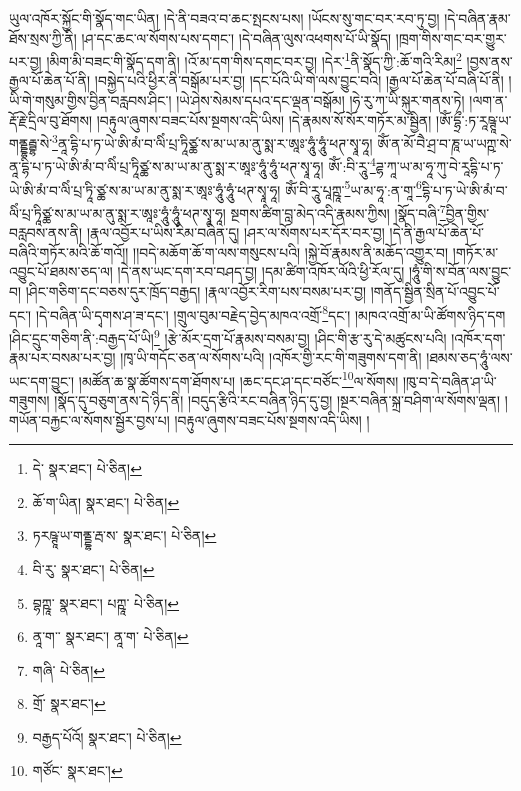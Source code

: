 ཡུལ་འཁོར་སྐྱོང་གི་སྣོད་གང་ཡིན། །དེ་ནི་བཟའ་བ་ཆང་སྤངས་པས། །ཡོངས་སུ་གང་བར་རབ་ཏུ་བྱ། །དེ་བཞིན་རྣམ་ཐོས་སྲས་ཀྱི་ནི། །ཤ་དང་ཆང་ལ་སོགས་པས་དགང་། །དེ་བཞིན་ལུས་འཕགས་པོ་ཡི་སྣོད། །ཁྲག་གིས་གང་བར་གྱུར་པར་བྱ། །མིག་མི་བཟང་གི་སྣོད་དག་ནི། །འོ་མ་དག་གིས་དགང་བར་བྱ། །དེར་\footnote{དེ་  སྣར་ཐང་།  པེ་ཅིན། }ནི་སྣོད་ཀྱི་:ཆོ་གའི་རིམ།\footnote{ཆོ་ག་ཡིན།  སྣར་ཐང་།  པེ་ཅིན། } །བྱས་ནས་རྒྱལ་པོ་ཆེན་པོ་ནི། །བསྐྱེད་པའི་ཕྱིར་ནི་བསྒོམ་པར་བྱ། །དང་པོའི་ཡི་གེ་ལས་བྱུང་བའི། །རྒྱལ་པོ་ཆེན་པོ་བཞི་པོ་ནི། །ཡི་གེ་གསུམ་གྱིས་བྱིན་བརླབས་ཤིང་། །ཡེ་ཤེས་སེམས་དཔའ་དང་ལྡན་བསྒོམ། །ཧེ་རུ་ཀ་ཡི་སྐུར་གནས་ཏེ། །ལག་ན་རྡོ་རྗེ་དྲིལ་བུ་ཐོགས། །བརྟུལ་ཞུགས་བཟང་པོས་སྔགས་འདི་ཡིས། །དེ་རྣམས་སོ་སོར་གཏོར་མ་སྦྱིན། །ཨོཾ་དྷྲྀ་:ཏ་རཱཥྚཱ་ཡ་གནྡྷརྦྷ་སེ་\footnote{ཏརཥྚཱ་ཡ་གནྡྷ་རྦ་ས་  སྣར་ཐང་།  པེ་ཅིན། }ནཱ་དྷི་པ་ཏ་ཡེ་ཨི་མཾ་བ་ལིཾ་པྲ་ཏཱིཙྪ་ས་མ་ཡ་མ་ནུ་སྨ་ར་ཨཱཿ་ཧཱུཾ་ཧཱུཾ་ཕཊ་སྭཱ་ཧཱ། ཨོཾ་ན་མོ་བཻ་ཤྲ་བ་ཎཱ་ཡ་ཡཀྵ་སེ་ནཱ་དྷི་པ་ཏ་ཡེ་ཨི་མཾ་བ་ལིཾ་པྲ་ཏཱིཙྪ་ས་མ་ཡ་མ་ནུ་སྨ་ར་ཨཱཿ་ཧཱུཾ་ཧཱུཾ་ཕཊ་སྭཱ་ཧཱ། ཨོཾ་:བི་རཱུ་\footnote{བི་རུ་  སྣར་ཐང་།  པེ་ཅིན། }ཌྷ་ཀཱ་ཡ་མ་ཧཱ་ཀུ་བེ་རཱདྷི་པ་ཏ་ཡེ་ཨི་མཾ་བ་ལིཾ་པྲ་ཏཱི་ཙྪ་ས་མ་ཡ་མ་ནུ་སྨ་ར་ཨཱཿ་ཧཱུཾ་ཧཱུཾ་ཕཊ་སྭཱ་ཧཱ། ཨོཾ་བི་རཱུ་པཱཀྵཱ་\footnote{བྷཀྵཱ་  སྣར་ཐང་། པཀྵཱ་  པེ་ཅིན། }ཡ་མ་ཧཱ་:ན་གཱ་\footnote{ནཱ་ག་་  སྣར་ཐང་། ནཱ་ག་  པེ་ཅིན། }དྷི་པ་ཏ་ཡེ་ཨི་མཾ་བ་ལིཾ་པྲ་ཏཱིཙྪ་ས་མ་ཡ་མ་ནུ་སྨ་ར་ཨཱཿ་ཧཱུཾ་ཧཱུཾ་ཕཊ་སྭཱ་ཧཱ། སྔགས་ཚིག་བླ་མེད་འདི་རྣམས་ཀྱིས། །སྣོད་བཞི་\footnote{གཞི་  པེ་ཅིན། }བྱིན་གྱིས་བརླབས་ནས་ནི། །རྣལ་འབྱོར་པ་ཡིས་རིམ་བཞིན་དུ། །ཤར་ལ་སོགས་པར་དོར་བར་བྱ། །དེ་ནི་རྒྱལ་པོ་ཆེན་པོ་བཞིའི་གཏོར་མའི་ཆོ་གའོ།། །།བདེ་མཆོག་ཆོ་ག་ལས་གསུངས་པའི། །སྐྱེ་བོ་རྣམས་ནི་མཆོད་འགྱུར་བ། །གཏོར་མ་འབྱུང་པོ་ཐམས་ཅད་ལ། །དེ་ནས་ཡང་དག་རབ་བཤད་བྱ། །དམ་ཚིག་འཁོར་ལོའི་ཕྱི་རོལ་དུ། །ཧཱུཾ་གི་ས་བོན་ལས་བྱུང་བ། །ཤིང་གཅིག་དང་བཅས་དུར་ཁྲོད་བརྒྱད། །རྣལ་འབྱོར་རིག་པས་བསམ་པར་བྱ། །གནོད་སྦྱིན་སྲིན་པོ་འབྱུང་པོ་དང་། །དེ་བཞིན་ཡི་དྭགས་ཤ་ཟ་དང་། །གྲུལ་བུམ་བརྗེད་བྱེད་མཁའ་འགྲོ་\footnote{གྲོ་  སྣར་ཐང་། }དང་། །མཁའ་འགྲོ་མ་ཡི་ཚོགས་ཉིད་དག །ཤིང་དྲུང་གཅིག་ནི་:བརྒྱད་པོ་ཡི།\footnote{བརྒྱད་པོའོ།  སྣར་ཐང་།  པེ་ཅིན། } །རྩེ་མོར་དྲག་པོ་རྣམས་བསམ་བྱ། །ཤིང་གི་རྩ་རུ་དེ་མཚུངས་པའི། །འཁོར་དག་རྣམ་པར་བསམ་པར་བྱ། །ཁྭ་ཡི་གདོང་ཅན་ལ་སོགས་པའི། །འཁོར་གྱི་རང་གི་གཟུགས་དག་ནི། །ཐམས་ཅད་ཧཱུཾ་ལས་ཡང་དག་བྱུང་། །མཚོན་ཆ་སྣ་ཚོགས་དག་ཐོགས་པ། །ཆང་དང་ཤ་དང་བཙོང་\footnote{གཙོང་  སྣར་ཐང་། }ལ་སོགས། །ཁུ་བ་དེ་བཞིན་ཤ་ཡི་གཟུགས། །སྣོད་དུ་བཅུག་ནས་དེ་ཉིད་ནི། །བདུད་རྩིའི་རང་བཞིན་ཉིད་དུ་བྱ། །སྔར་བཞིན་སྐྲ་བཤིག་ལ་སོགས་ལྡན། །གཡོན་བརྐྱང་ལ་སོགས་སྦྱོར་བྱས་པ། །བརྟུལ་ཞུགས་བཟང་པོས་སྔགས་འདི་ཡིས། །
